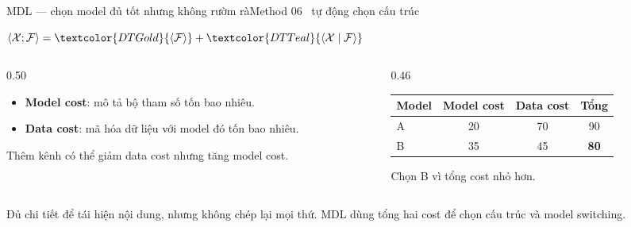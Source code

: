 \begin{frame}[shrink=24]{MDL --- chọn model đủ tốt nhưng không rườm rà}{Method 06 \textperiodcentered\ tự động chọn cấu trúc}
\begin{mathcard}\centering$\langle\mathcal X;\mathcal F\rangle=\textcolor{DTGold}{\langle\mathcal F\rangle}+\textcolor{DTTeal}{\langle\mathcal X\mid\mathcal F\rangle}$\end{mathcard}
\vspace{3mm}
\begin{columns}[T,onlytextwidth]
\begin{column}{0.50\textwidth}
\begin{mathcard}
  \begin{itemize}
    \item \textcolor{DTGold}{\textbf{Model cost}}: mô tả bộ tham số tốn bao nhiêu.
    \item \textcolor{DTTeal}{\textbf{Data cost}}: mã hóa dữ liệu với model đó tốn bao nhiêu.
  \end{itemize}
  Thêm kênh có thể giảm data cost nhưng tăng model cost.
\end{mathcard}
\end{column}
\begin{column}{0.46\textwidth}
\begin{intuition}
  \centering
  \begin{tabular}{lccc}
    \toprule
    Model & Model cost & Data cost & \textbf{Tổng}\\
    \midrule
    A & 20 & 70 & 90\\
    B & 35 & 45 & \textbf{80}\\
    \bottomrule
  \end{tabular}
  \vspace{2mm}

  Chọn B vì tổng cost nhỏ hơn.
\end{intuition}
\end{column}
\end{columns}
\vspace{3mm}
\begin{takeaway}
  Đủ chi tiết để tái hiện nội dung, nhưng không chép lại mọi thứ. MDL dùng tổng hai cost để chọn cấu trúc và model switching.
\end{takeaway}
\vspace{2mm}
\end{frame}

